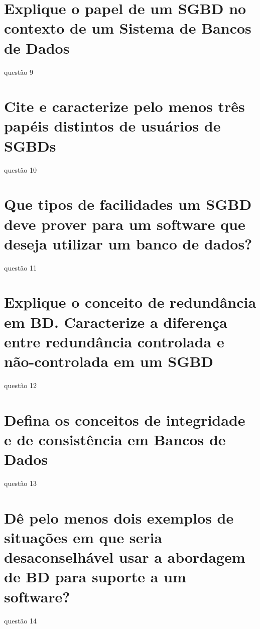 \documentclass[12pt]{article}
\begin{document}
\section{Explique o papel de um SGBD no contexto de um Sistema de Bancos de Dados}
questão 9

\section{Cite e caracterize pelo menos três papéis distintos de usuários de SGBDs}
questão 10

\section{Que tipos de facilidades um SGBD deve prover para um software que deseja utilizar um banco de dados?}
questão 11

\section{Explique o conceito de redundância em BD. Caracterize a diferença entre redundância controlada e não-controlada em um SGBD}
questão 12

\section{Defina os conceitos de integridade e de consistência em Bancos de Dados}
questão 13

\section{Dê pelo menos dois exemplos de situações em que seria desaconselhável usar a abordagem de BD para suporte a um software?}
questão 14
\end{document}
